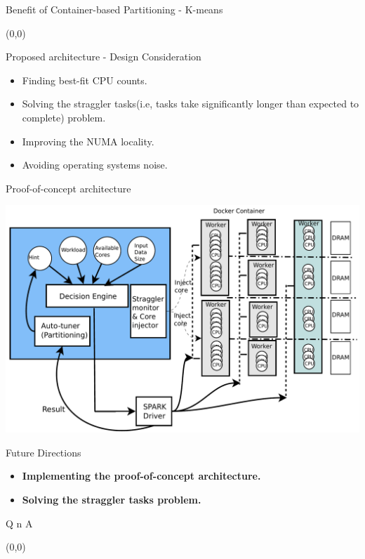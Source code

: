 \documentclass[english]{beamer} %
\begin{document}
\begin{frame}{Benefit of Container-based Partitioning - K-means}
\begin{textblock}{1}(0,0)
\end{textblock} 
\end{frame}

\begin{frame}{Proposed architecture - Design Consideration}
    \begin{itemize}
    \item Finding best-fit CPU counts.
    \item Solving the straggler tasks(i.e, tasks take significantly longer than
    expected to complete) problem.
    \item Improving the NUMA locality.
    \item Avoiding operating systems noise.
    \end{itemize}
\end{frame}

\begin{frame}{Proof-of-concept architecture}
\begin{center}
\includegraphics[scale=0.4]{fig/jaildocker}
\end{center}
\end{frame}

\begin{frame}{Future Directions}
\begin{itemize}
\item \textbf{Implementing the proof-of-concept architecture.} 
\item \textbf{Solving the straggler tasks problem.} 
\end{itemize}
\end{frame}

\begin{frame}{Q n A}
\begin{textblock}{1}(0,0)
\end{textblock}
\end{frame}
\end{document}
